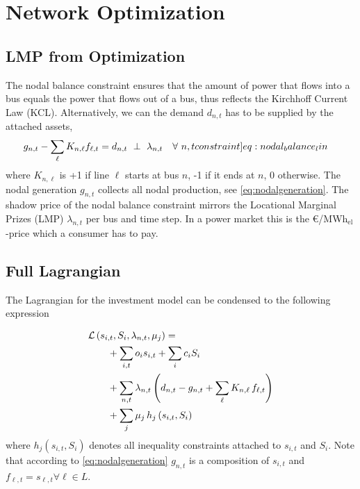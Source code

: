\documentclass[11pt,twocolumn]{article}
\newcommand{\resultsin}[1]{\hspace{6pt} \bot  \hspace{6pt} #1}
\newcommand{\Forall}[1]{\hspace{10pt} \forall \,\, #1 }
\newcommand{\state}[1][i]{s_{#1,t}}
\newcommand{\capacity}{S_{i}}
\newcommand{\nodalgeneration}[1][n]{g_{#1,t}}
\newcommand{\flow}{f_{\ell,t}}
\newcommand{\lagrangian}{\mathcal{L}}
\newcommand{\lmp}[1][n]{\lambda_{#1,t}}
\newcommand{\demand}[1][n]{d_{#1,t}}
\newcommand{\nodaldemand}[1][n]{d_{#1,t}}
\newcommand{\incidence}[1][n]{K_{#1,\ell}}
\newcommand{\megawatthour}{MWh$_\text{el}$}
\begin{document}

\clearpage
\appendix

\section{Network Optimization}

\renewcommand\theequation{\thesection.\arabic{equation}}
\setcounter{equation}{0}

\renewcommand\thefigure{\thesection.\arabic{figure}}    
\setcounter{figure}{0}    

\subsection{LMP from Optimization}
\label{sec:lmp}
The nodal balance constraint ensures that the amount of power that flows into a bus equals the power that flows out of a bus, thus reflects the Kirchhoff Current Law (KCL). Alternatively, we can the demand $\demand$ has to be supplied by the attached assets,  
\begin{align}
    \nodalgeneration - \sum_\ell \incidence \flow  &=  \demand 
     \resultsin{\lmp} \Forall{n,t}
    \label[constraint]{eq:nodal_balance_lin}
\end{align}
where $\incidence$ is +1 if line $\ell$ starts at bus $n$, -1 if it ends at $n$, 0 otherwise. The nodal generation $\nodalgeneration$ collects all nodal production, see \cref{eq:nodalgeneration}. The shadow price of the nodal balance constraint mirrors the Locational Marginal Prizes (LMP) $\lmp$ per bus and time step. In a power market this is the \euro/\megawatthour-price which a consumer has to pay.\\

\subsection{Full Lagrangian}
\label{sec:full_lagrangian}
The Lagrangian for the investment model can be condensed to the following expression

\begin{align}
\notag
& \lagrangian\left(\state, \capacity, \lmp, \mu_j \right) = \\ 
\notag
& \qquad + \sum_{i,t} o_i \state + \sum_{i} c_i \capacity  \\
\notag
&\qquad +  \sum_{n,t} \lmp \left( \demand - \nodalgeneration + \sum_\ell \incidence \, \flow \right) \\
&\qquad + \sum_j \mu_j \, h_j \left(\state, \capacity \right)
\label{eq:full_lagrangian}
\end{align}
where $h_j \left(\state, \capacity \right)$ denotes all inequality constraints attached to $\state$ and $\capacity$. Note that according to \cref{eq:nodalgeneration} $\nodalgeneration$ is a composition of $\state$ and $\flow = \state[\ell] \forall \ell \in L$.
\end{document}
